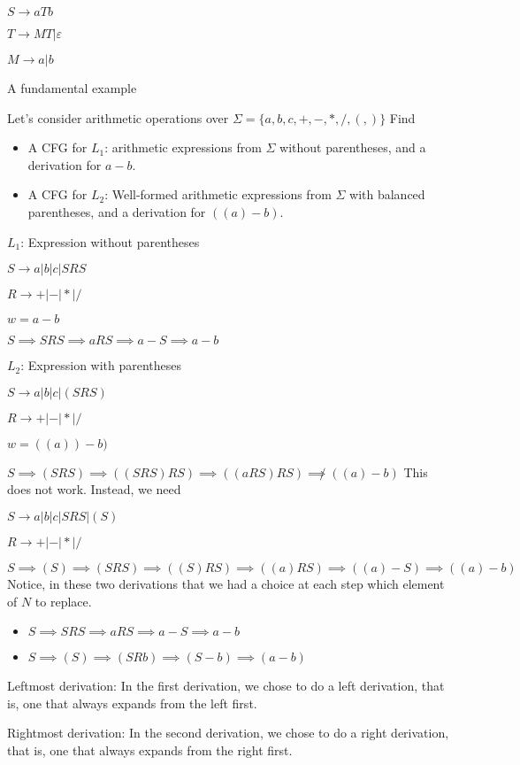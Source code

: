 \documentclass{article}
\begin{document}
\(S \to a T b\)

\(T \to MT | \varepsilon\)

\(M \to a | b\)

A fundamental example

Let's consider arithmetic operations over
\(\Sigma = \{a,b,c,+,-,*,/,(,)\}\) Find 
\begin{itemize}
    \item A CFG for \(L_1\): arithmetic expressions from \(\Sigma\) without parentheses, and a derivation for \(a - b\).
    \item A CFG for \(L_2\): Well-formed arithmetic expressions from \(\Sigma\) with balanced parentheses, and a derivation for \(((a) - b)\).
\end{itemize}


\(L_1\): Expression without parentheses

\(S \to a | b | c | SRS\)

\(R \to + | - | * | /\)

\(w = a - b\)

\(S \implies SRS \implies aRS \implies a - S \implies a - b\)

\(L_2\): Expression with parentheses

\(S \to a | b | c | (SRS)\)

\(R \to + | - | * | /\)

\(w = ((a))-b)\)

\(S \implies (SRS) \implies ((SRS)RS) \implies ((aRS)RS) \not\implies ((a) - b)\)
This does not work. Instead, we need

\(S \to a | b | c | SRS | (S)\)

\(R \to + | - | * | /\)

\(S \implies (S) \implies (SRS) \implies ((S)RS) \implies ((a)RS) \implies ((a)-S) \implies ((a)-b)\)
Notice, in these two derivations that we had a choice at each step which
element of \(N\) to replace.

\begin{itemize}
\item
  \(S \implies SRS \implies aRS \implies a-S \implies a-b\)
\item
  \(S \implies (S) \implies (SRb) \implies (S - b) \implies (a -b)\)
\end{itemize}

Leftmost derivation: In the first derivation, we chose to do a left
derivation, that is, one that always expands from the left first.

Rightmost derivation: In the second derivation, we chose to do a right
derivation, that is, one that always expands from the right first.
\end{document}
